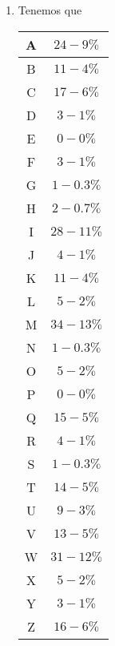 \documentclass[letterpaper,11pt]{article}
\begin{document}
\begin{enumerate}
\begin{enumerate}
\begin{enumerate}
            \newpage
            \item Tenemos que 
            \begin{center}
                \begin{tabular}{|c|c|}
                \hline
                A & $24-9\%$ \\ \hline
                B & $11-4\%$ \\ \hline
                C & $17-6\%$ \\ \hline
                D & $3-1\%$ \\ \hline
                E & $0-0\%$ \\ \hline
                F & $3-1\%$ \\ \hline
                G & $1-0.3\%$ \\ \hline
                H & $2-0.7\%$ \\ \hline
                I & $28-11\%$ \\ \hline
                J & $4-1\%$ \\ \hline
                K & $11-4\%$ \\ \hline
                L & $5-2\%$ \\ \hline
                M & $34-13\%$ \\ \hline
                N & $1-0.3\%$ \\ \hline
                O & $5-2\%$ \\ \hline
                P & $0-0\%$\\ \hline
                Q & $15-5\%$ \\ \hline
                R & $4-1\%$ \\ \hline
                S & $1-0.3\%$ \\ \hline
                T & $14-5\%$ \\ \hline
                U & $9-3\%$ \\ \hline
                V & $13-5\%$ \\ \hline
                W & $31-12\%$ \\ \hline
                X & $5-2\%$ \\ \hline
                Y & $3-1\%$ \\ \hline
                Z & $16-6\%$ \\ \hline
                \end{tabular}
            \end{center}


\end{enumerate}
\end{enumerate}
\end{enumerate}
\end{document}

